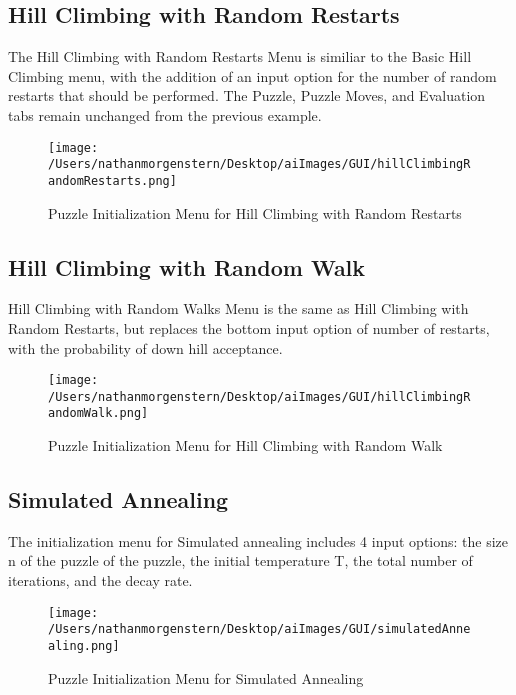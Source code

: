 \documentclass{report}
\begin{document}
\subsection{Hill Climbing with Random Restarts}
The Hill Climbing with Random Restarts Menu is similiar to the Basic Hill Climbing menu, with the addition of an input option for the number of random restarts that should be performed. The Puzzle, Puzzle Moves, and Evaluation tabs remain unchanged from the previous example.

	\begin{figure}[H]
	\centering
	\texttt{[image: /Users/nathanmorgenstern/Desktop/aiImages/GUI/hillClimbingRandomRestarts.png]}
	\caption{Puzzle Initialization Menu for Hill Climbing with Random Restarts}
	\label{fig: Puzzle Initialization Menu for Hill Climbing with Random Restarts}
	\end{figure}
	
\newpage	
\subsection{Hill Climbing with Random Walk}
Hill Climbing with Random Walks Menu is the same as Hill Climbing with Random Restarts, but replaces the bottom input option of number of restarts, with the probability of down hill acceptance.

	\begin{figure}[H]
	\centering
	\texttt{[image: /Users/nathanmorgenstern/Desktop/aiImages/GUI/hillClimbingRandomWalk.png]}
	\caption{Puzzle Initialization Menu for Hill Climbing with Random Walk}
	\label{fig: Puzzle Initialization Menu for Hill Climbing with Random Walk}
	\end{figure}
	
\newpage	
\subsection{Simulated Annealing}
The initialization menu for Simulated annealing includes 4 input options: the size n of the puzzle of the puzzle, the initial temperature T, the total number of iterations, and the decay rate.
 
	\begin{figure}[H]
	\centering
	\texttt{[image: /Users/nathanmorgenstern/Desktop/aiImages/GUI/simulatedAnnealing.png]}
	\caption{Puzzle Initialization Menu for Simulated Annealing}
	\label{fig: Puzzle Initialization Menu for Simulated Annealing}
	\end{figure}
	
\end{document}
